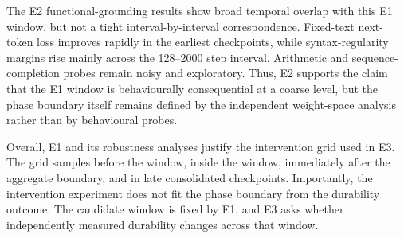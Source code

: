 The E2 functional-grounding results show broad temporal overlap with this E1 window, but not a tight interval-by-interval correspondence. Fixed-text next-token loss improves rapidly in the earliest checkpoints, while syntax-regularity margins rise mainly across the 128--2000 step interval. Arithmetic and sequence-completion probes remain noisy and exploratory. Thus, E2 supports the claim that the E1 window is behaviourally consequential at a coarse level, but the phase boundary itself remains defined by the independent weight-space analysis rather than by behavioural probes.

Overall, E1 and its robustness analyses justify the intervention grid used in E3. The grid samples before the window, inside the window, immediately after the aggregate boundary, and in late consolidated checkpoints. Importantly, the intervention experiment does not fit the phase boundary from the durability outcome. The candidate window is fixed by E1, and E3 asks whether independently measured durability changes across that window.
